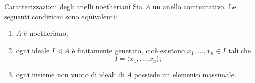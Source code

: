 \documentclass[a4paper]{article}
\begin{document}
\begin{radioactive}
\begin{snippettheorem}{Caratterizzazioni degli anelli noetheriani}
    Sia \(A\) un anello commutativo. Le seguenti condizioni sono equivalenti:
    \begin{enumerate}
        \item \(A\) è noetheriano;
        \item ogni ideale \(I\triangleleft A\) è finitamente generato, cioè esistono \(x_1,\ldots,x_n\in I\) tali che
        \[
            I=\langle x_1,\ldots,x_n \rangle;
        \]
        \item ogni insieme non vuoto di ideali di \(A\) possiede un elemento massimale.
    \end{enumerate}
\end{snippettheorem}
\end{radioactive}
\end{document}
